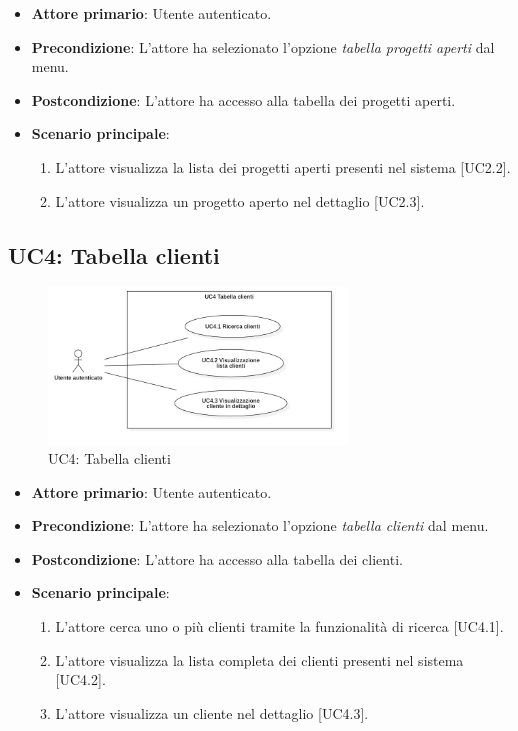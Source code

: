 \begin{itemize}
\item \textbf{Attore primario}: Utente autenticato.
\item \textbf{Precondizione}: L'attore ha selezionato l'opzione \textit{tabella progetti aperti} dal menu.
\item \textbf{Postcondizione}: L'attore ha accesso alla tabella dei progetti aperti.
\item \textbf{Scenario principale}: 
\begin{enumerate}
\item L'attore visualizza la lista dei progetti aperti presenti nel sistema [UC2.2].
\item L'attore visualizza un progetto aperto nel dettaglio [UC2.3].
\end{enumerate}
\end{itemize}

\pagebreak

\subsection{UC4: Tabella clienti}
\begin{figure}[!h]
\centering
\includegraphics[width=300px]{../images/UC/.jpeg/UC4.0-tabellaClienti.jpg}
\caption{UC4: Tabella clienti}
\end{figure}

\begin{itemize}
\item \textbf{Attore primario}: Utente autenticato.
\item \textbf{Precondizione}: L'attore ha selezionato l'opzione \textit{tabella clienti} dal menu.
\item \textbf{Postcondizione}: L'attore ha accesso alla tabella dei clienti.
\item \textbf{Scenario principale}: 
\begin{enumerate}
\item L'attore cerca uno o più clienti tramite la funzionalità di ricerca [UC4.1].
\item L'attore visualizza la lista completa dei clienti presenti nel sistema [UC4.2].
\item L'attore visualizza un cliente nel dettaglio [UC4.3].
\end{enumerate}
\end{itemize}

